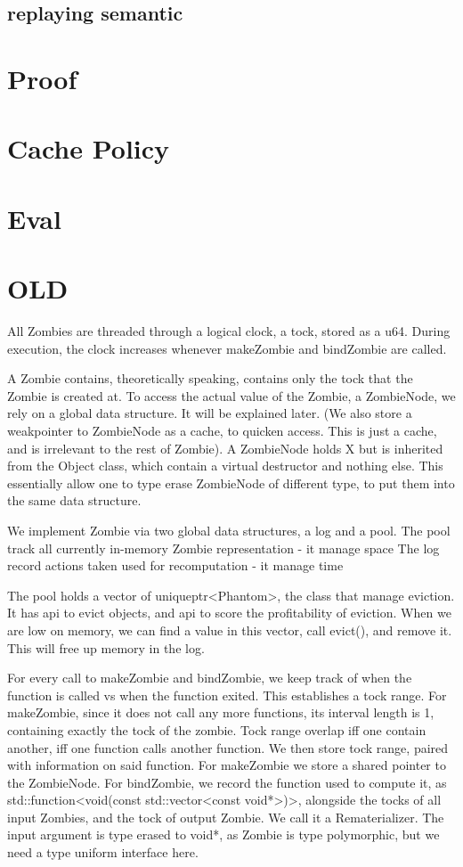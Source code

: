 \documentclass[acmsmall]{acmart}
\begin{document}
	\subsection{replaying semantic}
	\section{Proof}
	
	\section{Cache Policy}
	
	\section{Eval}
	
	\section{OLD}
	All Zombies are threaded through a logical clock, a tock, stored as a u64.
	During execution, the clock increases whenever makeZombie and bindZombie are called.
	
	A Zombie contains, theoretically speaking, contains only the tock that the Zombie is created at.
	To access the actual value of the Zombie, a ZombieNode, we rely on a global data structure.
	It will be explained later.
	(We also store a weakpointer to ZombieNode as a cache, to quicken access. This is just a cache, and is irrelevant to the rest of Zombie).
	A ZombieNode holds X but is inherited from the Object class, which contain a virtual destructor and nothing else. This essentially allow one to type erase ZombieNode of different type, to put them into the same data structure.
	
	We implement Zombie via two global data structures, a log and a pool.
	The pool track all currently in-memory Zombie representation - it manage space
	The log record actions taken used for recomputation - it manage time
	
	The pool holds a vector of uniqueptr<Phantom>, the class that manage eviction.
	It has api to evict objects, and api to score the profitability of eviction.
	When we are low on memory, we can find a value in this vector, call evict(), and remove it.
	This will free up memory in the log.
	
	For every call to makeZombie and bindZombie, we keep track of when the function is called vs when the function exited. This establishes a tock range. 
	For makeZombie, since it does not call any more functions, its interval length is 1, containing exactly the tock of the zombie.
	Tock range overlap iff one contain another, iff one function calls another function. We then store tock range, paired with information on said function. 
	For makeZombie we store a shared pointer to the ZombieNode. 
	For bindZombie, we record the function used to compute it, as std::function<void(const std::vector<const void*>)>, alongside the tocks of all input Zombies, and the tock of output Zombie. We call it a Rematerializer. The input argument is type erased to void*, as Zombie is type polymorphic, but we need a type uniform interface here.
	
\end{document}
